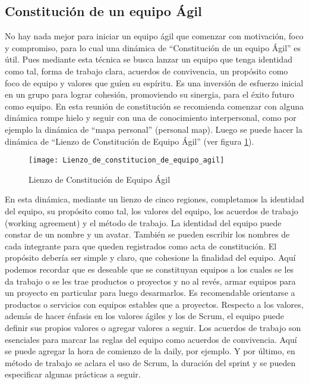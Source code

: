 \subsection{Constitución de un equipo Ágil}

No hay nada mejor para iniciar un equipo ágil que comenzar con motivación, foco y compromiso, para lo cual una dinámica de  “Constitución de un equipo Ágil” es útil. Pues mediante esta técnica se busca lanzar un equipo que tenga identidad como tal, forma de trabajo clara, acuerdos de convivencia, un propósito como foco de equipo y valores que guíen su espíritu. Es una inversión de esfuerzo inicial en un grupo para lograr cohesión, promoviendo su sinergia, para el éxito futuro como equipo. En esta reunión de constitución se recomienda comenzar con alguna dinámica rompe hielo y seguir con una de conocimiento interpersonal, como por ejemplo la dinámica de “mapa personal” (personal map). Luego se puede hacer la dinámica de “Lienzo de Constitución de Equipo Ágil” (ver figura \ref{fig:Lienzo_de_constitucion_de_equipo_agil}). 

\begin{figure}[h]
  \centering
  \texttt{[image: Lienzo\_de\_constitucion\_de\_equipo\_agil]}
  \caption{Lienzo de Constitución de Equipo Ágil}
  \centering
  \label{fig:Lienzo_de_constitucion_de_equipo_agil} %
\end{figure}
\FloatBarrier %

En esta dinámica, mediante un lienzo de cinco regiones, completamos la identidad del equipo, su propósito como tal, los valores del equipo, los acuerdos de trabajo (working agreement) y el método de trabajo. La identidad del equipo puede constar de un nombre y un avatar. También se pueden escribir los nombres de cada integrante para que queden registrados como acta de constitución. El propósito debería ser simple y claro, que cohesione la finalidad del equipo. Aquí podemos recordar que es deseable que se constituyan equipos a los cuales se les da trabajo o se les trae productos o proyectos y no al revés, armar equipos para un proyecto en particular para luego desarmarlos. Es recomendable orientarse a productos o servicios con equipos estables que a proyectos. Respecto a los valores, además de hacer énfasis en los valores ágiles y los de Scrum, el equipo puede definir sus propios valores o agregar valores a seguir. Los acuerdos de trabajo son esenciales para marcar las reglas del equipo como acuerdos de convivencia. Aquí se puede agregar la hora de comienzo de la daily, por ejemplo. Y por último, en método de trabajo se aclara el uso de Scrum, la duración del sprint y se pueden especificar algunas prácticas a seguir.

